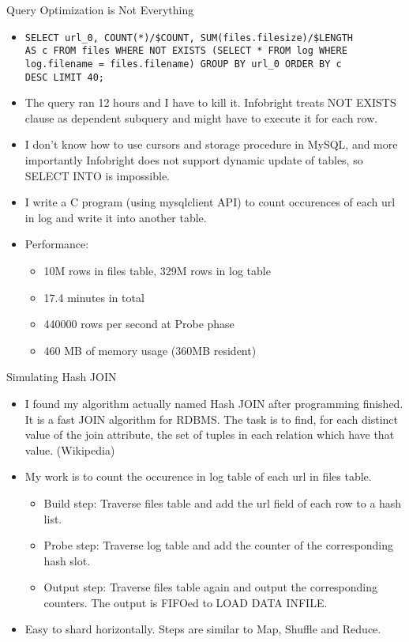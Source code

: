 \documentclass{beamer}
\begin{document}
\begin{frame}[fragile]{Query Optimization is Not Everything}
\begin{itemize}
  \item {\small
\begin{verbatim}
SELECT url_0, COUNT(*)/$COUNT, SUM(files.filesize)/$LENGTH
AS c FROM files WHERE NOT EXISTS (SELECT * FROM log WHERE
log.filename = files.filename) GROUP BY url_0 ORDER BY c
DESC LIMIT 40;
\end{verbatim}
}
  \item The query ran 12 hours and I have to kill it. Infobright treats NOT EXISTS clause as dependent subquery and might have to execute it for each row.
  \item I don't know how to use cursors and storage procedure in MySQL, and more importantly Infobright does not support dynamic update of tables, so SELECT INTO is impossible. 
  \item I write a C program (using mysqlclient API) to count occurences of each url in log and write it into another table.
  \item Performance:
  \begin{itemize}
    \item 10M rows in files table, 329M rows in log table
    \item 17.4 minutes in total
    \item 440000 rows per second at Probe phase
    \item 460 MB of memory usage (360MB resident)
  \end{itemize}
\end{itemize}
\end{frame}

\begin{frame}{Simulating Hash JOIN}
\begin{itemize}
  \item I found my algorithm actually named Hash JOIN after programming finished. It is a fast JOIN algorithm for RDBMS. The task is to find, for each distinct value of the join attribute, the set of tuples in each relation which have that value. (Wikipedia)
  \item My work is to count the occurence in log table of each url in files table.
  \begin{itemize}
    \item Build step: Traverse files table and add the url field of each row to a hash list.
    \item Probe step: Traverse log table and add the counter of the corresponding hash slot.
    \item Output step: Traverse files table again and output the corresponding counters. The output is FIFOed to LOAD DATA INFILE.
  \end{itemize}
  \item Easy to shard horizontally. Steps are similar to Map, Shuffle and Reduce.
\end{itemize}
\end{frame}
\end{document}
